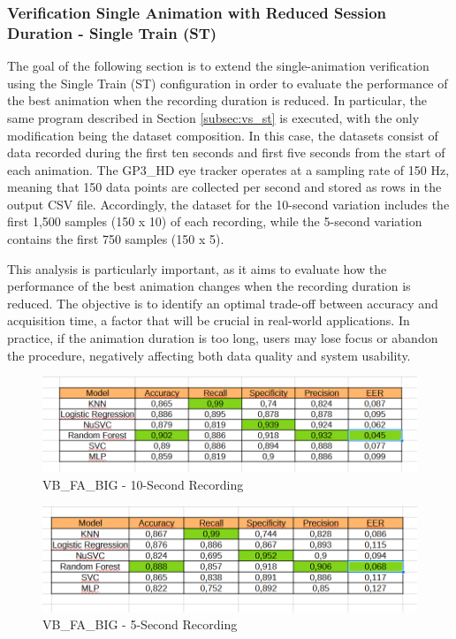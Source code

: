 \documentclass{article}
\begin{document}
\subsubsection{Verification Single Animation with Reduced Session Duration - Single Train (ST)}

The goal of the following section is to extend the single-animation verification using the Single Train (ST) configuration in order to evaluate the performance of the best animation when the recording duration is reduced.
In particular, the same program described in Section \ref{subsec:vs_st} is executed, with the only modification being the dataset composition.
In this case, the datasets consist of data recorded during the first ten seconds and first five seconds from the start of each animation.
The GP3\_HD eye tracker operates at a sampling rate of 150 Hz, meaning that 150 data points are collected per second and stored as rows in the output CSV file.
Accordingly, the dataset for the 10-second variation includes the first 1,500 samples (150 x 10) of each recording, while the 5-second variation contains the first 750 samples (150 x 5).

This analysis is particularly important, as it aims to evaluate how the performance of the best animation changes when the recording duration is reduced.
The objective is to identify an optimal trade-off between accuracy and acquisition time, a factor that will be crucial in real-world applications.
In practice, if the animation duration is too long, users may lose focus or abandon the procedure, negatively affecting both data quality and system usability.

\begin{figure}[ht]
    \centering
    \includegraphics[width = 0.8
    \textwidth]{Images/Results/Verification_single_five_ten/st/ten/VB_FA_BIG_ten_st.png}
    \caption{VB\_FA\_BIG - 10-Second Recording}
    \label{fig:VB_FA_BIG_10_st}
\end{figure}

\begin{figure}[ht]
    \centering
    \includegraphics[width = 0.8
    \textwidth]{Images/Results/Verification_single_five_ten/st/five/VB_FA_BIG_five_st.png}
    \caption{VB\_FA\_BIG - 5-Second Recording}
    \label{fig:VB_FA_BIG_5_st}
\end{figure}
\end{document}
